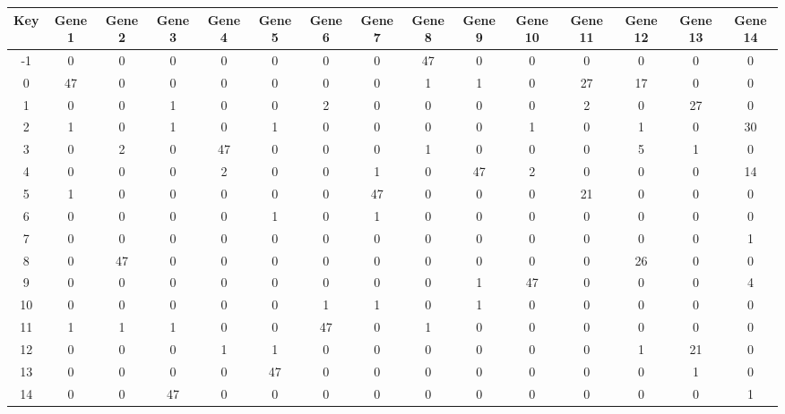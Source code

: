 \begin{tabular}{|c|c|c|c|c|c|c|c|c|c|c|c|c|c|c|}
\hline
Key & Gene 1 & Gene 2 & Gene 3 & Gene 4 & Gene 5 & Gene 6 & Gene 7 & Gene 8 & Gene 9 & Gene 10 & Gene 11 & Gene 12 & Gene 13 & Gene 14 \\
\hline
-1 & 0 & 0 & 0 & 0 & 0 & 0 & 0 & 47 & 0 & 0 & 0 & 0 & 0 & 0 \\
0 & 47 & 0 & 0 & 0 & 0 & 0 & 0 & 1 & 1 & 0 & 27 & 17 & 0 & 0 \\
1 & 0 & 0 & 1 & 0 & 0 & 2 & 0 & 0 & 0 & 0 & 2 & 0 & 27 & 0 \\
2 & 1 & 0 & 1 & 0 & 1 & 0 & 0 & 0 & 0 & 1 & 0 & 1 & 0 & 30 \\
3 & 0 & 2 & 0 & 47 & 0 & 0 & 0 & 1 & 0 & 0 & 0 & 5 & 1 & 0 \\
4 & 0 & 0 & 0 & 2 & 0 & 0 & 1 & 0 & 47 & 2 & 0 & 0 & 0 & 14 \\
5 & 1 & 0 & 0 & 0 & 0 & 0 & 47 & 0 & 0 & 0 & 21 & 0 & 0 & 0 \\
6 & 0 & 0 & 0 & 0 & 1 & 0 & 1 & 0 & 0 & 0 & 0 & 0 & 0 & 0 \\
7 & 0 & 0 & 0 & 0 & 0 & 0 & 0 & 0 & 0 & 0 & 0 & 0 & 0 & 1 \\
8 & 0 & 47 & 0 & 0 & 0 & 0 & 0 & 0 & 0 & 0 & 0 & 26 & 0 & 0 \\
9 & 0 & 0 & 0 & 0 & 0 & 0 & 0 & 0 & 1 & 47 & 0 & 0 & 0 & 4 \\
10 & 0 & 0 & 0 & 0 & 0 & 1 & 1 & 0 & 1 & 0 & 0 & 0 & 0 & 0 \\
11 & 1 & 1 & 1 & 0 & 0 & 47 & 0 & 1 & 0 & 0 & 0 & 0 & 0 & 0 \\
12 & 0 & 0 & 0 & 1 & 1 & 0 & 0 & 0 & 0 & 0 & 0 & 1 & 21 & 0 \\
13 & 0 & 0 & 0 & 0 & 47 & 0 & 0 & 0 & 0 & 0 & 0 & 0 & 1 & 0 \\
14 & 0 & 0 & 47 & 0 & 0 & 0 & 0 & 0 & 0 & 0 & 0 & 0 & 0 & 1 \\
\hline
\end{tabular}